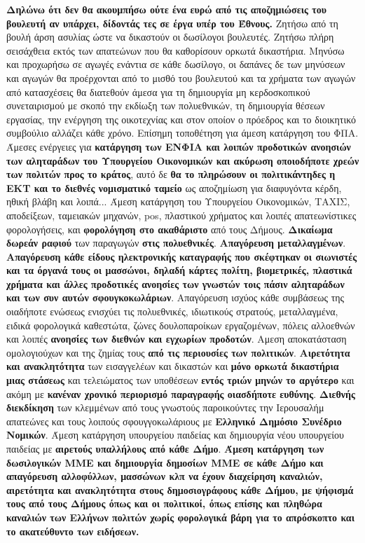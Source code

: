 \documentclass[a4paper]{article}
\begin{document}
\textbf{Δηλώνω ότι δεν θα ακουμπήσω ούτε ένα ευρώ από τις αποζημιώσεις του βουλευτή αν υπάρχει, δίδοντάς τες σε έργα υπέρ του Έθνους.} Ζητήσω από τη βουλή άρση ασυλίας ώστε να δικαστούν οι δωσίλογοι βουλευτές. Ζητήσω πλήρη σεισάχθεια εκτός των απατεώνων που θα καθορίσουν ορκωτά δικαστήρια. Μηνύσω και προχωρήσω σε αγωγές ενάντια σε κάθε δωσίλογο, οι δαπάνες δε των μηνύσεων και αγωγών θα προέρχονται από το μισθό του βουλευτού και τα χρήματα των αγωγών από κατασχέσεις θα διατεθούν άμεσα για τη δημιουργία μη κερδοσκοπικού συνεταιρισμού με σκοπό την εκδίωξη των πολυεθνικών, τη δημιουργία θέσεων εργασίας, την ενέργηση της οικοτεχνίας και στον οποίον ο πρόεδρος και το διοικητικό συμβούλιο αλλάζει κάθε χρόνο. Επίσημη τοποθέτηση για άμεση κατάργηση του ΦΠΑ. Άμεσες ενέργειες για \textbf{κατάργηση των ΕΝΦΙΑ και λοιπών προδοτικών ανοησιών των αληταράδων του Υπουργείου Οικονομικών και ακύρωση οποιοδήποτε χρεών των πολιτών προς το κράτος}, αυτό δε \textbf{θα το πληρώσουν οι πολιτικάντηδες η ΕΚΤ και το διεθνές νομισματικό ταμείο} ως αποζημίωση για διαφυγόντα κέρδη, ηθική βλάβη και λοιπά... Άμεση κατάργηση του Υπουργείου Οικονομικών, ΤΑΧΙΣ, αποδείξεων, ταμειακών μηχανών, pos, πλαστικού χρήματος και λοιπές απατεωνίστικες φορολογήσεις, και \textbf{φορολόγηση στο ακαθάριστο} από τους Δήμους. \textbf{Δικαίωμα δωρεάν ραφιού} των παραγωγών \textbf{στις πολυεθνικές}. \textbf{Απαγόρευση μεταλλαγμένων}. \textbf{Απαγόρευση κάθε είδους ηλεκτρονικής καταγραφής που σκέφτηκαν οι σιωνιστές και τα όργανά τους οι μασσώνοι, δηλαδή κάρτες πολίτη, βιομετρικές, πλαστικά χρήματα και άλλες προδοτικές ανοησίες των γνωστών τοις πάσιν αληταράδων και των συν αυτών σφουγκοκωλάριων}. Απαγόρευση ισχύος κάθε συμβάσεως της οιαδήποτε ενώσεως ενισχύει τις πολυεθνικές, ιδιωτικούς στρατούς, μεταλλαγμένα, ειδικά φορολογικά καθεστώτα, ζώνες δουλοπαροίκων εργαζομένων, πόλεις αλλοεθνών και λοιπές \textbf{ανοησίες των διεθνών και εγχωρίων προδοτών}. Αμεση αποκατάσταση ομολογιούχων και της ζημίας τους \textbf{από τις περιουσίες των πολιτικών}. \textbf{Αιρετότητα και ανακλητότητα} των εισαγγελέων και δικαστών και \textbf{μόνο ορκωτά δικαστήρια μιας στάσεως} και τελειώματος των υποθέσεων \textbf{εντός τριών μηνών το αργότερο} και ακόμη με \textbf{κανέναν χρονικό περιορισμό παραγραφής οιασδήποτε ευθύνης}. \textbf{Διεθνής διεκδίκηση} των κλεμμένων από τους γνωστούς παροικούντες την Ιερουσαλήμ απατεώνες και τους λοιπούς σφουγγοκωλάριους με \textbf{Ελληνικό Δημόσιο Συνέδριο Νομικών}. Άμεση κατάργηση υπουργείου παιδείας και δημιουργία νέου υπουργείου παιδείας με \textbf{αιρετούς υπαλλήλους από κάθε Δήμο}. \textbf{Άμεση κατάργηση των δωσιλογικών ΜΜΕ και δημιουργία δημοσίων ΜΜΕ σε κάθε Δήμο και απαγόρευση αλλοφύλλων, μασσώνων κλπ να έχουν διαχείρηση καναλιών, αιρετότητα και ανακλητότητα στους δημοσιογράφους κάθε Δήμου, με ψήφισμά τους από τους Δήμους όπως και οι πολιτικοί, όπως επίσης και πληθώρα καναλιών των Ελλήνων πολιτών χωρίς φορολογικά βάρη για το απρόσκοπτο και το ακατεύθυντο των ειδήσεων.}\\
\end{document}
